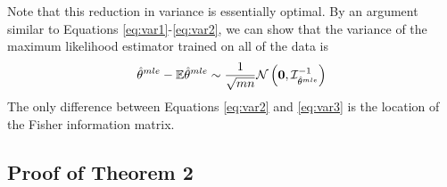 \documentclass[twoside]{article}
\newcommand{\zero}{\text{\textbf{0}}}
\newcommand{\E}{\mathbb{E}}
\newcommand{\w}{\theta}
\newcommand{\wmle}{\hat\w^{mle}}
\newcommand{\I}{\mathcal I}
\newcommand{\normal}[2]{\ensuremath{\mathcal{N}\left({{#1}},{{#2}}\right)}}
\begin{document}
Note that this reduction in variance is essentially optimal.
By an argument similar to Equations \ref{eq:var1}-\ref{eq:var2},
we can show that the variance of the maximum likelihood estimator trained on all of the data is
\begin{equation}
\wmle - \E\wmle \sim \frac{1}{\sqrt{mn}} \normal{\zero}{\I^{-1}_{\wmle}}
\label{eq:var3}
\end{equation}
The only difference between Equations \ref{eq:var2} and \ref{eq:var3} is the location of the Fisher information matrix.


\subsection {Proof of Theorem 2}
\end{document}
